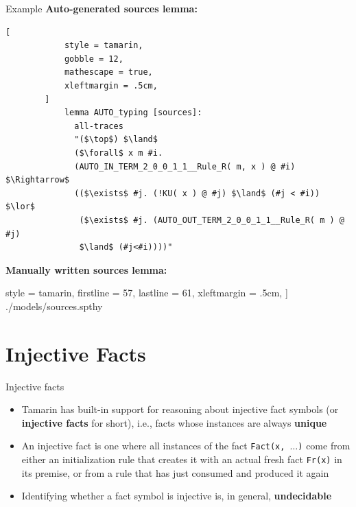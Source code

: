 \documentclass[11pt,aspectratio=169]{beamer}
\begin{document}
\begin{frame}[fragile]{Example}
    \textbf{Auto-generated sources lemma:}
        \vspace*{.2cm}
        \begin{lstlisting}[
            style = tamarin,
            gobble = 12,
            mathescape = true,
            xleftmargin = .5cm,
        ]
            lemma AUTO_typing [sources]:
              all-traces
              "($\top$) $\land$
              ($\forall$ x m #i.
              (AUTO_IN_TERM_2_0_0_1_1__Rule_R( m, x ) @ #i) $\Rightarrow$
              (($\exists$ #j. (!KU( x ) @ #j) $\land$ (#j < #i)) $\lor$
               ($\exists$ #j. (AUTO_OUT_TERM_2_0_0_1_1__Rule_R( m ) @ #j) 
               $\land$ (#j<#i))))"
        \end{lstlisting}
    \textbf{Manually written sources lemma:}
        \vspace*{.2cm}
        
            style = tamarin,
            firstline = 57,
            lastline  = 61,
            xleftmargin = .5cm,
        ] {./models/sources.spthy}
\end{frame}


\section{Injective Facts}


\begin{frame}[fragile]{Injective facts}
    \begin{itemize}
        \item Tamarin has built-in support for reasoning about
              injective fact symbols (or \textbf{injective facts} for short),
              i.e., facts whose instances are always \textbf{unique}
        \item An injective fact is one where all instances of the fact
              \texttt{Fact(\tildelow{}x, $\dots$)} come from either an 
              initialization rule that creates it with an actual fresh fact 
              \texttt{Fr(\tildelow{}x)} in its premise, or from a rule that has 
              just consumed and produced it again
        \item Identifying whether a fact symbol is injective is, in general, 
              \textbf{undecidable}
    \end{itemize}
\end{frame}
\end{document}
